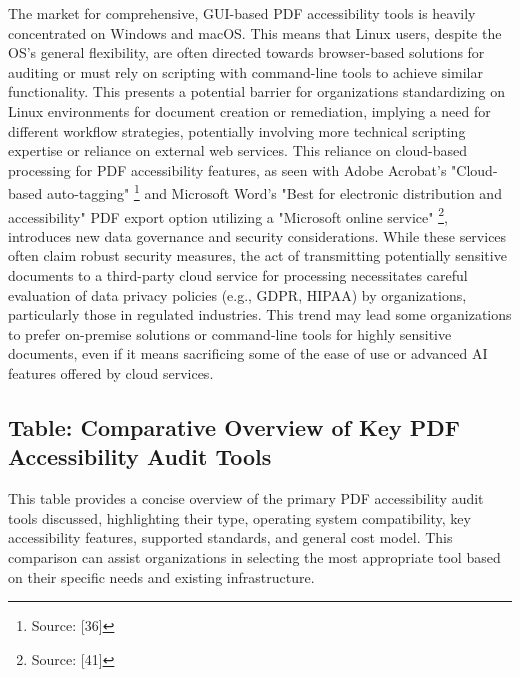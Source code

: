 The market for comprehensive, GUI-based PDF accessibility tools is heavily concentrated on Windows and macOS. This means that Linux users, despite the OS's general flexibility, are often directed towards browser-based solutions for auditing or must rely on scripting with command-line tools to achieve similar functionality. This presents a potential barrier for organizations standardizing on Linux environments for document creation or remediation, implying a need for different workflow strategies, potentially involving more technical scripting expertise or reliance on external web services. This reliance on cloud-based processing for PDF accessibility features, as seen with Adobe Acrobat's "Cloud-based auto-tagging" \footnote{Source: [36]} and Microsoft Word's "Best for electronic distribution and accessibility" PDF export option utilizing a "Microsoft online service" \footnote{Source: [41]}, introduces new data governance and security considerations. While these services often claim robust security measures, the act of transmitting potentially sensitive documents to a third-party cloud service for processing necessitates careful evaluation of data privacy policies (e.g., GDPR, HIPAA) by organizations, particularly those in regulated industries. This trend may lead some organizations to prefer on-premise solutions or command-line tools for highly sensitive documents, even if it means sacrificing some of the ease of use or advanced AI features offered by cloud services.

\subsection{Table: Comparative Overview of Key PDF Accessibility Audit Tools}

This table provides a concise overview of the primary PDF accessibility audit tools discussed, highlighting their type, operating system compatibility, key accessibility features, supported standards, and general cost model. This comparison can assist organizations in selecting the most appropriate tool based on their specific needs and existing infrastructure.

